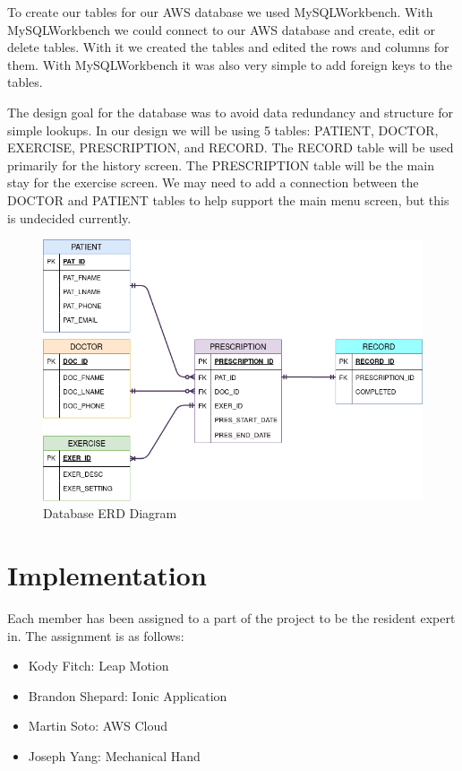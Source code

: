 \documentclass[a4paper,10pt]{article}
\begin{document}
	To create our tables for our AWS database we used MySQLWorkbench. With MySQLWorkbench we could connect to our AWS database and create, edit or delete tables. With it we created the tables and edited the rows and columns for them. With MySQLWorkbench it was also very simple to add foreign keys to the tables. 
            
            The design goal for the database was to avoid data redundancy and structure for simple lookups. In our design we will be using 5 tables: PATIENT, DOCTOR, EXERCISE, PRESCRIPTION, and RECORD. The RECORD table will be used primarily for the history screen. The PRESCRIPTION table will be the main stay for the exercise screen. We may need to add a connection between the DOCTOR and PATIENT tables to help support the main menu screen, but this is undecided currently. 
            
            \begin{figure}[H]
            \centering
            \includegraphics[width=140mm, scale=1]{databaseDiagram}
            \caption{Database ERD Diagram}
            \end{figure}
            

\section{Implementation}

            Each member has been assigned to a part of the project to be the resident expert in. The assignment is as follows:
        \begin{itemize}
         \item Kody Fitch: Leap Motion
         \item Brandon Shepard: Ionic Application
         \item Martin Soto: AWS Cloud
         \item Joseph Yang: Mechanical Hand
        \end{itemize}
\end{document}
